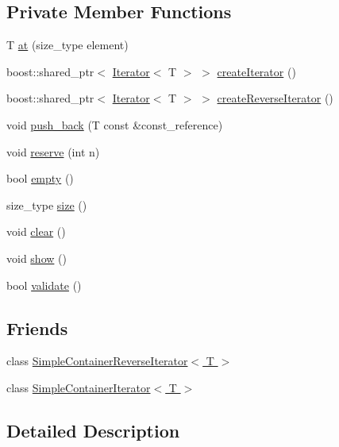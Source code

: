 \subsection*{Private Member Functions}
\begin{DoxyCompactItemize}
\item 
T \hyperlink{class_simple_container_a2e8f56f3af1e0ffb1fcd54d05d82c477}{at} (size\_\-type element)
\item 
boost::shared\_\-ptr$<$ \hyperlink{class_iterator}{Iterator}$<$ T $>$ $>$ \hyperlink{class_simple_container_a4e46f5cb32231deaf9aa9bb7f871d09e}{createIterator} ()
\item 
boost::shared\_\-ptr$<$ \hyperlink{class_iterator}{Iterator}$<$ T $>$ $>$ \hyperlink{class_simple_container_acb880d7d14d0067085aa7b7c90602628}{createReverseIterator} ()
\item 
void \hyperlink{class_simple_container_a53466966297b3f0a707e025b3721004a}{push\_\-back} (T const \&const\_\-reference)
\item 
void \hyperlink{class_simple_container_a4bca44e6a9cef9d57627218c0a180d8a}{reserve} (int n)
\item 
bool \hyperlink{class_simple_container_ac2966f33796f69c290a84361a578ed08}{empty} ()
\item 
size\_\-type \hyperlink{class_simple_container_a2fdb3580e1728e6e2ba6ef77c0bce63e}{size} ()
\item 
void \hyperlink{class_simple_container_ae3ee6cb18f1dd33ab5de4f9854ce245f}{clear} ()
\item 
void \hyperlink{class_simple_container_af4d591e2c3a44ae016e01e3d07d1e9ac}{show} ()
\item 
bool \hyperlink{class_simple_container_ac7cae8eaac2dc0a69138b65f679bd16a}{validate} ()
\end{DoxyCompactItemize}
\subsection*{Friends}
\begin{DoxyCompactItemize}
\item 
class \hyperlink{class_simple_container_a0fe65b06d8220d8fcb1d34e1496b8399}{SimpleContainerReverseIterator$<$ T $>$}
\item 
class \hyperlink{class_simple_container_a9abe836547cca50b94869af58a0901f7}{SimpleContainerIterator$<$ T $>$}
\end{DoxyCompactItemize}


\subsection{Detailed Description}
